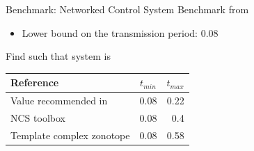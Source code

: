 \begin{frame}{Benchmark: Networked Control System}
Benchmark from
~\cite{wittenmark2002computer}

\begin{itemize}
\item Lower bound on the transmission period: $0.08$
\end{itemize}
%
\begin{alertblock}{}
Find   such that
system is 
\end{alertblock}
%
\begin{table}
\begin{tabular}{|l|c|r|}
  \hline
  Reference & $t_{min}$ & $t_{max}$ \\
\hline
Value recommended in~\cite{wittenmark2002computer} & 0.08 & 0.22\\
  \hline
  NCS toolbox~\cite{BauLoo_NECSYS12a} & 0.08 & 0.4 \\
\hline
  Template complex zonotope & 0.08 & 0.58 \\
  \hline
\end{tabular}
\end{table}
%
\end{frame}



